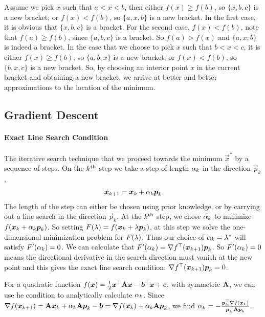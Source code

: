 Assume we pick $x$ such that $a<x<b$, then either $f(x)\geq f(b)$, so $\{x,b,c\}$ is a new bracket; or $f(x)<f(b)$, so $\{a,x,b\}$ is a new bracket. In the first case, it is obvious that $\{x,b,c\}$ is a bracket. For the second case, $f(x)<f(b)$, note that $f(a)\geq f(b)$, since $\{a,b,c\}$ is a bracket. So $f(a)>f(x)$ and $\{a,x,b\}$ is indeed a bracket. In the case that we choose to pick $x$ such that $b<x<c$, it is either $f(x)\geq f(b)$, so $\{a,b,x\}$ is a new bracket; or $f(x)<f(b)$, so $\{b,x,c\}$ is a new bracket. So, by choosing an interior point $x$ in the current bracket and obtaining a new bracket, we arrive at better and better approximations to the location of the minimum.

\subsection{Gradient Descent}

\paragraph{Exact Line Search Condition}

The iterative search technique that we proceed towards the minimum $\vec{x}^*$ by a sequence of steps. On the $k^\text{th}$ step we take a step of length $\alpha_k$ in the direction $\vec{p}_k$,
\begin{align*}
	\boldsymbol{x}_{k+1}=\boldsymbol{x}_k+\alpha_k\boldsymbol{p}_k
\end{align*}
The length of the step can either be chosen using prior knowledge, or by carrying out a line search in the direction $\vec{p}_k$. At the $k^\text{th}$ step, we chose $\alpha_k$ to minimize $f(\boldsymbol{x}_k+\alpha_k\boldsymbol{p}_k)$. So setting $F(\lambda)=f(\boldsymbol{x}_k+\lambda\boldsymbol{p}_k)$, at this step we solve the one-dimensional minimization problem for $F(\lambda)$. Thus our choice of $\alpha_k=\lambda^*$ will satisfy $F'(\alpha_k)=0$. We can calculate that $F'(\alpha_k)=\nabla f^\top(\boldsymbol{x}_{k+1})\boldsymbol{p}_k$. So $F'(\alpha_k)=0$ means the directional derivative in the search direction must vanish at the new point and this gives the exact line search condition: $\nabla f{}^\top(\boldsymbol{x}_{k+1})\boldsymbol{p}_k=0$.

For a quadratic function $f(\boldsymbol{x})=\frac{1}{2}\boldsymbol{x}{}^\top\mathbf{A}\boldsymbol{x}-\boldsymbol{b}{}^\top\boldsymbol{x}+c$, with symmetric $\mathbf{A}$, we can use he condition to analytically calculate $\alpha_k$. Since $\nabla f(\boldsymbol{x}_{k+1})=\mathbf{A}\boldsymbol{x}_k+\alpha_k\mathbf{A}\boldsymbol{p}_k-\boldsymbol{b}=\nabla f(\boldsymbol{x}_k)+\alpha_k\mathbf{A}\boldsymbol{p}_k$, we find $\alpha_k=-\frac{\boldsymbol{p}_k^\top\nabla f(\boldsymbol{x}_k)}{\boldsymbol{p}_k^\top\mathbf{A}\boldsymbol{p}_k}$.

